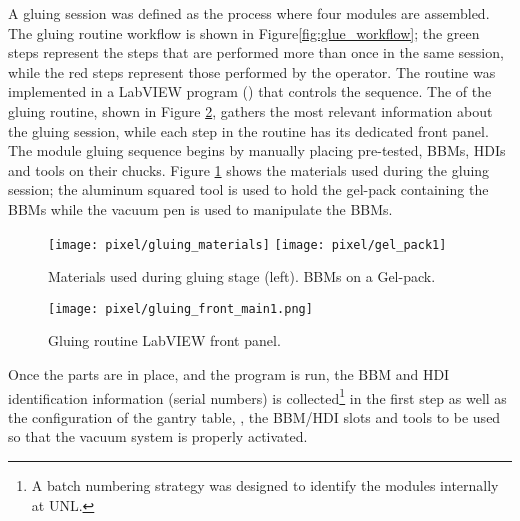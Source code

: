A gluing session was defined as the process where four modules are assembled. The gluing routine workflow is shown in Figure\ref{fig:glue_workflow}; the green steps represent the steps that are performed more than once in the same session, while the red steps represent those performed by the operator. The routine was implemented in a LabVIEW program () that controls the sequence. The  of the gluing routine, shown in Figure \ref{fig:gluing_front_main}, gathers the most relevant information about the gluing session, while each step in the routine has its dedicated front panel. The module gluing sequence begins by manually placing pre-tested, BBMs, HDIs and tools on their chucks. Figure \ref{fig:gluing_materials} shows the materials used during the gluing session; the aluminum squared tool is used to hold the gel-pack containing the BBMs while the vacuum pen is used to manipulate the BBMs.

\begin{figure}[h]
\begin{center}
  \texttt{[image: pixel/gluing\_materials]}
  \texttt{[image: pixel/gel\_pack1]}
 \caption[Materials used during gluing stage]{Materials used during gluing stage (left). BBMs on a Gel-pack.}\label{fig:gluing_materials}
\end{center}
\end{figure}

\begin{landscape}
\begin{figure}[h]
  \begin{center}
    \vspace{-2.5cm}
    \hspace{-1cm}
    \texttt{[image: pixel/gluing\_front\_main1.png]}
    \caption[Gluing routine LabVIEW front panel]{Gluing routine LabVIEW front panel.}\label{fig:gluing_front_main}
    \vspace{-2cm}
    \hspace{-2cm}
  \end{center}
\end{figure}
\end{landscape}


Once the parts are in place, and the program is run, the BBM and HDI identification information (serial numbers) is collected\footnote{A batch numbering strategy was designed to identify the modules internally at UNL.} in the first step as well as the configuration of the gantry table, \ie, the BBM/HDI slots and tools to be used so that the vacuum system is properly activated. 

